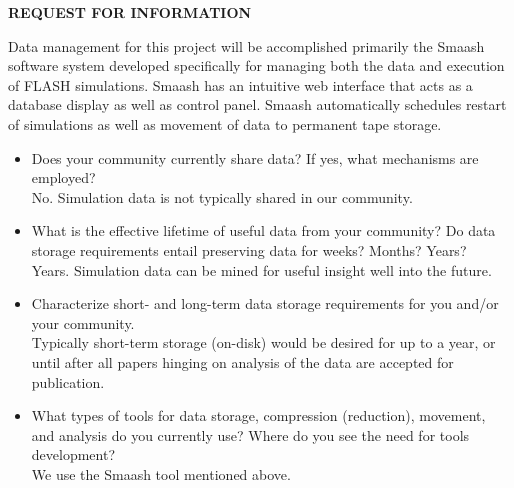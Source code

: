\documentclass[12pt,letterpaper,english]{article}
\begin{document}
\setlength{\parindent}{0in} %


\pagestyle{fancy}   \renewcommand{%
\headrulewidth}{0.0pt}

\begin{center}
\bf \large {REQUEST FOR INFORMATION} \\
\end{center}

\vspace{-.25in}

Data management for this project will be accomplished primarily the
Smaash software system developed specifically for managing both the
data and execution of FLASH simulations.  Smaash has an intuitive web
interface that acts as a database display as well as control panel.
Smaash automatically schedules restart of simulations as well as
movement of data to permanent tape storage.

\vspace{-.15in}
\begin{itemize}

\item Does your community currently share data? If yes, what
  mechanisms are employed? \\ 
No.  Simulation data is not typically shared in our community.\\
\item What is the effective lifetime of useful data from your
  community? Do data storage requirements entail preserving data for
  weeks? Months? Years? \\
Years.  Simulation data can be mined for useful insight well into the future.\\
\item Characterize short- and long-term data storage requirements for
  you and/or your community.\\
Typically short-term storage (on-disk) would be desired for up to a
year, or until after all papers hinging on analysis of the data are
accepted for publication.  \\
\item What types of tools for data storage, compression (reduction),
  movement, and analysis do you currently use? Where do you see the
  need for tools development?\\
We use the Smaash tool mentioned above.
\end{itemize} 
\vspace{-.15in}
\end{document}
